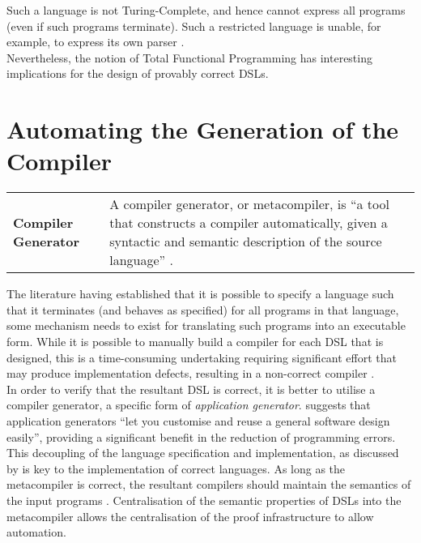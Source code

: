 \documentclass[a4paper,11pt]{report}
\newcommand{\defblock}[3]{
    \begin{longtable}{l p{#1}} 
        \textbf{#2} & #3
    \end{longtable}
}
\begin{document}
Such a language is not Turing-Complete, and hence cannot express all programs (even if such programs terminate). 
Such a restricted language is unable, for example, to express its own parser \citep{turner2004total}.\\

Nevertheless, the notion of Total Functional Programming has interesting implications for the design of provably correct DSLs.



\section{Automating the Generation of the Compiler} %
\label{sec:automating_the_generation_of_the_compiler}
\defblock{10cm}{Compiler Generator}{
    A compiler generator, or metacompiler, is ``a tool that constructs a compiler automatically, given a syntactic and semantic description of the source language'' \citep{brown1992actress}.
}

The literature having established that it is possible to specify a language such that it terminates (and behaves as specified) for all programs in that language, some mechanism needs to exist for translating such programs into an executable form.
While it is possible to manually build a compiler for each DSL that is designed, this is a time-consuming undertaking requiring significant effort that may produce implementation defects, resulting in a non-correct compiler \citep{Mernik:2005:DDL:1118890.1118892}.\\

In order to verify that the resultant DSL is correct, it is better to utilise a compiler generator, a specific form of \textit{application generator}.
\citet{cleaveland1988building} suggests that application generators ``let you customise and reuse a general software design easily'', providing a significant benefit in the reduction of programming errors.\\

This decoupling of the language specification and implementation, as discussed by \citet{cleaveland1988building} is key to the implementation of correct languages.
As long as the metacompiler is correct, the resultant compilers should maintain the semantics of the input programs \citep{Gray:1992:ECF:129630.129637}.
Centralisation of the semantic properties of DSLs into the metacompiler allows the centralisation of the proof infrastructure to allow automation.\\
\end{document}
